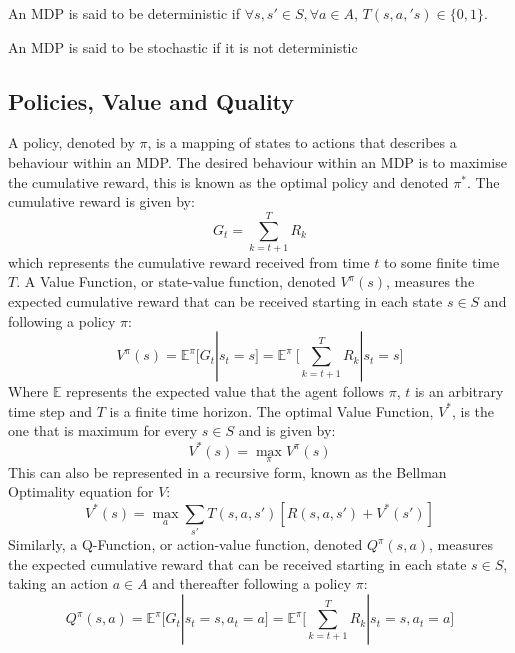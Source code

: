 \begin{defn}
\label{defn:determinism}
An MDP is said to be deterministic if $\forall s,s' \in S, \forall a \in A$, $T(s,a,'s) \in \{0,1\}$.
\end{defn}
\begin{defn}
\label{defn:stochastic}
An MDP is said to be stochastic if it is not deterministic
\end{defn}
\subsection{Policies, Value and Quality}
A policy, denoted by $\pi$, is a mapping of states to actions that describes a behaviour within an MDP. The desired behaviour within an MDP is to maximise the cumulative reward, this is known as the optimal policy and denoted $\pi^*$. The cumulative reward is given by:
\begin{equation}
\label{eqn:return}
G_t = \sum_{k=t+1}^TR_{k}
\end{equation}
which represents the cumulative reward received from time $t$ to some finite time $T$.
A Value Function, or state-value function, denoted $V^\pi(s)$, measures the expected cumulative reward that can be received starting in each state $s \in S$ and following a policy $\pi$:
\begin{equation}
\label{eqn:vs}
    V^\pi(s) = \mathbb{E}^\pi\Bigg[G_t | s_t = s\Bigg] = \mathbb{E}^\pi\ \Bigg[\sum_{k=t+1}^TR_{k} | s_t = s \Bigg]
\end{equation}
Where $\mathbb{E}$ represents the expected value that the agent follows $\pi$, $t$ is an arbitrary time step and $T$ is a finite time horizon.
The optimal Value Function, $V^*$, is the one that is maximum for every $s \in S$ and is given by:
\begin{equation}
\label{eqn:vsm}
     V^*(s) = \max_\pi V^\pi(s) 
\end{equation}
This can also be represented in a recursive form, known as the Bellman Optimality equation for $V$:
\begin{equation}
\label{eqn:vsB}
V^*(s) = \max_a\sum_{s'}T(s,a,s')[R(s,a,s')+V^*(s')]
\end{equation}
Similarly, a Q-Function, or action-value function, denoted $Q^\pi(s,a)$, measures the expected cumulative reward that can be received starting in each state $s \in S$, taking an action $a \in A$ and thereafter following a policy $\pi$:
\begin{equation}
\label{eqn:qsa}
Q^\pi(s,a) = \mathbb{E}^\pi\Bigg[G_t | s_t = s,a_t = a\Bigg] = \mathbb{E}^\pi\Bigg[\sum_{k=t+1}^TR_{k}|s_t=s, a_t = a\Bigg]
\end{equation}
